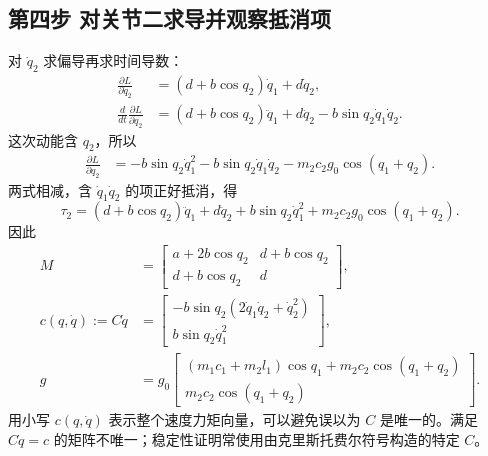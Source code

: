 \subsection{第四步 对关节二求导并观察抵消项}
对 $\dot q_2$ 求偏导再求时间导数：
\begin{align}
 \frac{\partial L}{\partial\dot q_2}&=(d+b\cos q_2)\dot q_1+d\dot q_2,\\
 \frac d{dt}\frac{\partial L}{\partial\dot q_2}
 &=(d+b\cos q_2)\ddot q_1+d\ddot q_2-b\sin q_2\dot q_1\dot q_2.
\end{align}
这次动能含 $q_2$，所以
\begin{align}
 \frac{\partial L}{\partial q_2}
 &=-b\sin q_2\dot q_1^2-b\sin q_2\dot q_1\dot q_2
 -m_2c_2g_0\cos(q_1+q_2).
\end{align}
两式相减，含 $\dot q_1\dot q_2$ 的项正好抵消，得
\begin{equation}
 \tau_2=(d+b\cos q_2)\ddot q_1+d\ddot q_2
 +b\sin q_2\dot q_1^2+m_2c_2g_0\cos(q_1+q_2).
\end{equation}
因此
\begin{align}\label{eq:2rM_di}
 M&=\begin{bmatrix}a+2b\cos q_2&d+b\cos q_2\\d+b\cos q_2&d\end{bmatrix},\\
 c(q,\dot q):=C\dot q&=\begin{bmatrix}-b\sin q_2(2\dot q_1\dot q_2+\dot q_2^2)\\b\sin q_2\dot q_1^2\end{bmatrix},\\
 g&=g_0\begin{bmatrix}(m_1c_1+m_2l_1)\cos q_1+m_2c_2\cos(q_1+q_2)\\m_2c_2\cos(q_1+q_2)\end{bmatrix}.
\end{align}
用小写 $c(q,\dot q)$ 表示整个速度力矩向量，可以避免误以为 $C$ 是唯一的。满足 $C\dot q=c$ 的矩阵不唯一；稳定性证明常使用由克里斯托费尔符号构造的特定 $C$。

